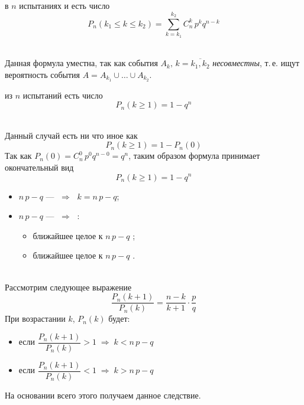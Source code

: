 \begin{corollary}
	 в $n$ испытаниях  и  есть число
	\[
		P_n(k_1 \leq k \leq k_2) = \sum_{k = k_1}^{k_2} C_n^k\,p^k q^{n-k}
	\]
\end{corollary}
\begin{Proof}\\
	Данная формула уместна, так как события $A_k,\, k = \overline{k_1, k_2}$ \textit{несовместны}, т.\,е. ищут вероятность события $A = A_{k_1} \cup \dots \cup A_{k_2}$.\\
\end{Proof}

\begin{corollary}
	 из $n$ испытаний есть число
	\[
		P_n(k \geq 1) = 1 - q^n
	\]
\end{corollary}
\begin{Proof}\\\hangindent=1cm
	Данный случай есть ни что иное как
	\[
		P_n(k \geq 1) = 1 - P_n(0)
	\]
	Так как $P_n(0) = C_n^0\,p^0 q^{n - 0} = q^n$, таким образом формула принимает окончательный вид
	\[
		P_n(k \geq 1) = 1 - q^n
	\]
\end{Proof}

\begin{corollary}\hfill
	\begin{itemize}
		\item $n\,p - q$ ---  $\;\Rightarrow\;$  $k = n\,p - q$;
		\item $n\,p - q$ ---  $\;\Rightarrow\;$ :
		\begin{itemize}
			\item ближайшее целое к $n\,p - q$ ;
			\item ближайшее целое к $n\,p - q$ .
		\end{itemize}
	\end{itemize}
\end{corollary}
\begin{Proof}\\
	Рассмотрим следующее выражение
	\[
		\frac{P_n(k+1)}{P_n(k)} = \frac{n-k}{k+1} \cdot \frac{p}{q}
	\]
	При возрастании $k$, $P_n(k)$ будет:
	\begin{itemize}
		\item {} если $\dfrac{P_n(k+1)}{P_n(k)} > 1 \;\Rightarrow\; k < n\,p - q$
		\item {} если $\dfrac{P_n(k+1)}{P_n(k)} < 1 \;\Rightarrow\; k > n\,p - q$
	\end{itemize} 
	На основании всего этого получаем данное следствие.\\
\end{Proof}
